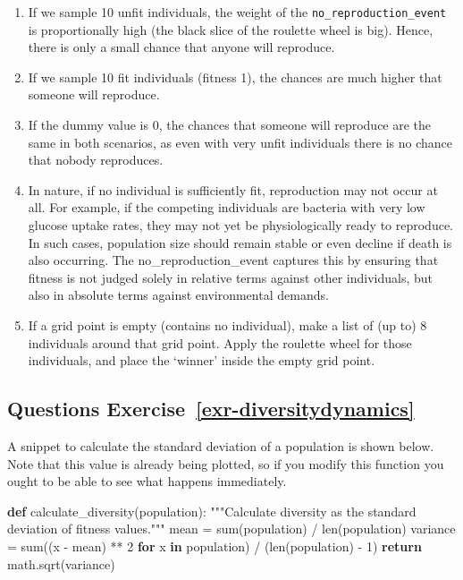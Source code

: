 \documentclass[
  letterpaper,
  DIV=11,
  numbers=noendperiod]{scrreprt}
\newenvironment{Shaded}{\begin{snugshade}}{\end{snugshade}}
\newcommand{\BuiltInTok}[1]{\textcolor[rgb]{0.00,0.23,0.31}{#1}}
\newcommand{\CommentTok}[1]{\textcolor[rgb]{0.37,0.37,0.37}{#1}}
\newcommand{\ControlFlowTok}[1]{\textcolor[rgb]{0.00,0.23,0.31}{\textbf{#1}}}
\newcommand{\DecValTok}[1]{\textcolor[rgb]{0.68,0.00,0.00}{#1}}
\newcommand{\KeywordTok}[1]{\textcolor[rgb]{0.00,0.23,0.31}{\textbf{#1}}}
\newcommand{\NormalTok}[1]{\textcolor[rgb]{0.00,0.23,0.31}{#1}}
\newcommand{\OperatorTok}[1]{\textcolor[rgb]{0.37,0.37,0.37}{#1}}
\providecommand{\tightlist}{%
  \setlength{\itemsep}{0pt}\setlength{\parskip}{0pt}}\usepackage{longtable,booktabs,array}
\theoremstyle{definition}
\theoremstyle{remark}
\begin{document}
\begin{enumerate}
\def\labelenumi{\alph{enumi}.}
\tightlist
\item
  If we sample 10 unfit individuals, the weight of the
  \texttt{no\_reproduction\_event} is proportionally high (the black
  slice of the roulette wheel is big). Hence, there is only a small
  chance that anyone will reproduce.
\item
  If we sample 10 fit individuals (fitness 1), the chances are much
  higher that someone will reproduce.
\item
  If the dummy value is 0, the chances that someone will reproduce are
  the same in both scenarios, as even with very unfit individuals there
  is no chance that nobody reproduces.
\item
  In nature, if no individual is sufficiently fit, reproduction may not
  occur at all. For example, if the competing individuals are bacteria
  with very low glucose uptake rates, they may not yet be
  physiologically ready to reproduce. In such cases, population size
  should remain stable or even decline if death is also occurring. The
  no\_reproduction\_event captures this by ensuring that fitness is not
  judged solely in relative terms against other individuals, but also in
  absolute terms against environmental demands.
\item
  If a grid point is empty (contains no individual), make a list of (up
  to) 8 individuals around that grid point. Apply the roulette wheel for
  those individuals, and place the `winner' inside the empty grid point.
\end{enumerate}

\subsection{\texorpdfstring{Questions
Exercise~\ref{exr-diversitydynamics}}{Questions Exercise~}}\label{questions-exr-diversitydynamics}

A snippet to calculate the standard deviation of a population is shown
below. Note that this value is already being plotted, so if you modify
this function you ought to be able to see what happens immediately.

\begin{Shaded}
\begin{Highlighting}[]
\KeywordTok{def}\NormalTok{ calculate\_diversity(population):}
    \CommentTok{"""Calculate diversity as the standard deviation of fitness values."""}
\NormalTok{    mean }\OperatorTok{=} \BuiltInTok{sum}\NormalTok{(population) }\OperatorTok{/} \BuiltInTok{len}\NormalTok{(population)}
\NormalTok{    variance }\OperatorTok{=} \BuiltInTok{sum}\NormalTok{((x }\OperatorTok{{-}}\NormalTok{ mean) }\OperatorTok{**} \DecValTok{2} \ControlFlowTok{for}\NormalTok{ x }\KeywordTok{in}\NormalTok{ population) }\OperatorTok{/}\NormalTok{ (}\BuiltInTok{len}\NormalTok{(population) }\OperatorTok{{-}} \DecValTok{1}\NormalTok{)}
    \ControlFlowTok{return}\NormalTok{ math.sqrt(variance)}
\end{Highlighting}
\end{Shaded}
\end{document}
